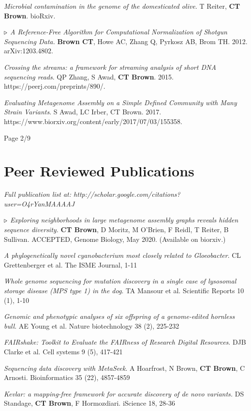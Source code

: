 \documentclass[margin,line]{resume}
\begin{document}
\begin{resume}
{\em Microbial contamination in the genome of the domesticated olive.} T Reiter, {\bf CT Brown}. bioRxiv.

{\color{red} ${\bf \triangleright}$}
{\em A Reference-Free Algorithm for Computational Normalization of Shotgun Sequencing Data.} {\bf Brown CT}, Howe AC, Zhang Q, Pyrkosz AB, Brom TH. 2012. arXiv:1203.4802.

{\em Crossing the streams: a framework for streaming analysis of short DNA sequencing reads}. QP Zhang, S Awad, {\bf CT Brown}. 2015. https://peerj.com/preprints/890/.

{\em Evaluating Metagenome Assembly on a Simple Defined Community with Many Strain Variants}. S Awad, LC Irber, CT Brown. 2017. https://www.biorxiv.org/content/early/2017/07/03/155358.

\vspace{1cm}
{\centerline {Page 2/9}}

\newpage

\section{\mysidestyle Peer Reviewed Publications}

{\em Full publication list at: http://scholar.google.com/citations?user=O4rYanMAAAAJ}

{\color{red} ${\bf \triangleright}$}
{\em Exploring neighborhoods in large metagenome assembly graphs reveals hidden sequence diversity.} {\bf CT Brown}, D Moritz, M O'Brien, F Reidl, T Reiter, B Sullivan. ACCEPTED, Genome Biology, May 2020. (Available on biorxiv.)

{\em A phylogenetically novel cyanobacterium most closely related to Gloeobacter}. CL Grettenberger et al.
The ISME Journal, 1-11

{\em Whole genome sequencing for mutation discovery in a single case of lysosomal storage disease (MPS type 1) in the dog}. TA Mansour et al. 
Scientific Reports 10 (1), 1-10

{\em Genomic and phenotypic analyses of six offspring of a genome-edited hornless bull}. AE Young et al. Nature biotechnology 38 (2), 225-232

{\em FAIRshake: Toolkit to Evaluate the FAIRness of Research Digital Resources}. DJB Clarke et al.
Cell systems 9 (5), 417-421

{\em Sequencing data discovery with MetaSeek}. A Hoarfrost, N Brown, {\bf CT Brown}, C Arnosti. Bioinformatics 35 (22), 4857-4859

{\em Kevlar: a mapping-free framework for accurate discovery of de novo variants.} DS Standage, {\bf CT Brown}, F Hormozdiari. iScience 18, 28-36


\end{resume}
\end{document}
